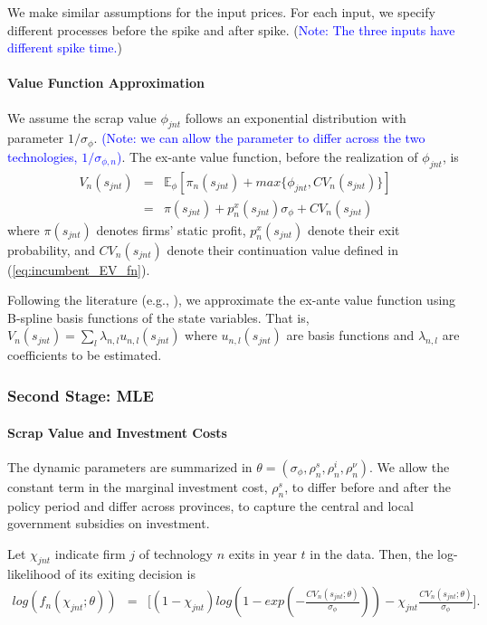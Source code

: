 \documentclass[12pt]{article}
\begin{document}
We make similar assumptions for the input prices. For each input, we specify different processes before the spike and after spike. (\textcolor{blue}{Note: The three inputs have different spike time.})


\paragraph*{Value Function Approximation}
We assume the scrap value $\phi_{jnt}$ follows an exponential distribution with parameter $1/\sigma_{\phi}$. \textcolor{blue}{(Note: we can allow the parameter to differ across the two technologies, $1/\sigma_{\phi,n}$)}. The ex-ante value function, before the realization of $\phi_{jnt}$, is
\begin{eqnarray}
    V_n(s_{jnt}) & = & \mathbb{E}_\phi[\pi_n(s_{jnt}) + max\{\phi_{jnt},CV_n(s_{jnt})\}] \nonumber \\
    & = & \pi(s_{jnt}) + p_n^x(s_{jnt}) \sigma_\phi + CV_n(s_{jnt})
\end{eqnarray}
where $\pi(s_{jnt})$ denotes firms' static profit, $p_n^x(s_{jnt})$ denote their exit probability, and $CV_n(s_{jnt})$ denote their continuation value defined in (\ref{eq:incumbent_EV_fn}).

Following the literature (e.g., \citet{sweeting2013dynamic}), we approximate the ex-ante value function using B-spline basis functions of the state variables. That is, $V_n(s_{jnt}) = \sum_l \lambda_{n,l} u_{n,l}(s_{jnt})$ where $u_{n,l}(s_{jnt})$ are basis functions and $\lambda_{n,l}$ are coefficients to be estimated.


\subsubsection{Second Stage: MLE}
\paragraph{Scrap Value and Investment Costs}
The dynamic parameters are summarized in $\theta = (\sigma_\phi, \rho^s_n, \rho^i_n, \rho^{\nu}_n )$. We allow the constant term in the marginal investment cost, $\rho^s_n$, to differ before and after the policy period and differ across provinces, to capture the central and local government subsidies on investment. 


Let $\chi_{jnt}$ indicate firm $j$ of technology $n$ exits in year $t$ in the data. Then, the log-likelihood of its exiting decision is
\begin{eqnarray}
    log(f_{n}(\chi_{jnt};\theta)) &=& \Big[ (1-\chi_{jnt}) log(1-exp(-\frac{CV_n(s_{jnt};\theta)}{\sigma_\phi})) - \chi_{jnt} \frac{CV_n(s_{jnt};\theta)}{\sigma_\phi} \Big].
\end{eqnarray}
\end{document}
